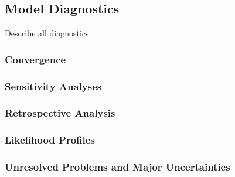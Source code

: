 \documentclass[11pt,
  english,
  a4paper,
]{article}
\begin{document}
\leavevmode\tagmcend\tagstructend


\hypertarget{model-diagnostics}{%
\subsection{Model Diagnostics}\label{model-diagnostics}}

\leavevmode\tagmcend\tagstructend

Describe all diagnostics


\hypertarget{convergence}{%
\subsubsection{Convergence}\label{convergence}}

\leavevmode\tagmcend\tagstructend


\hypertarget{sensitivity-analyses}{%
\subsubsection{Sensitivity Analyses}\label{sensitivity-analyses}}

\leavevmode\tagmcend\tagstructend


\hypertarget{retrospective-analysis}{%
\subsubsection{Retrospective Analysis}\label{retrospective-analysis}}

\leavevmode\tagmcend\tagstructend


\hypertarget{likelihood-profiles}{%
\subsubsection{Likelihood Profiles}\label{likelihood-profiles}}

\leavevmode\tagmcend\tagstructend


\hypertarget{unresolved-problems-and-major-uncertainties-1}{%
\subsubsection{Unresolved Problems and Major Uncertainties}\label{unresolved-problems-and-major-uncertainties-1}}
\end{document}
